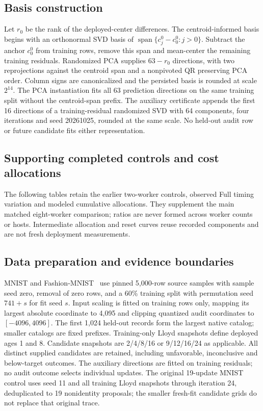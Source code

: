 \subsection{Basis construction}
Let $r_0$ be the rank of the deployed-center differences. The centroid-informed
basis begins with an orthonormal SVD basis of
$\operatorname{span}\{c^0_j-c^0_0:j>0\}$. Subtract the anchor $c^0_0$ from
training rows, remove this span and mean-center the remaining training
residuals. Randomized PCA supplies $63-r_0$ directions, with two
reprojections against the centroid span and a nonpivoted QR preserving PCA
order. Column signs are canonicalized and the persisted basis is rounded at
scale $2^{14}$. The PCA instantiation fits all 63 prediction directions on the
same training split without the centroid-span prefix. The auxiliary
certificate appends the first 16 directions of a training-residual randomized
SVD with 64 components, four iterations and seed 20261025, rounded at the same
scale. No held-out audit row or future candidate fits either representation.

\subsection{Supporting completed controls and cost allocations}
The following tables retain the earlier two-worker controls, observed Full
timing variation and modeled cumulative allocations. They supplement the
main matched eight-worker comparison; ratios are never formed across worker
counts or hosts. Intermediate allocation and reset curves reuse recorded
components and are not fresh deployment measurements.




\subsection{Data preparation and evidence boundaries}
MNIST and Fashion-MNIST~\cite{lecun1998,fashion2017} use pinned 5,000-row
source samples with sample seed zero, removal of zero rows, and a 60\%
training split with permutation seed $741+s$ for fit seed $s$. Input scaling
is fitted on training rows only, mapping its largest absolute coordinate to
4,095 and clipping quantized audit coordinates to $[-4096,4096]$.
The first 1,024 held-out records form the largest native catalog; smaller
catalogs are fixed prefixes. Training-only Lloyd snapshots define deployed
ages 1 and 8. Candidate snapshots are 2/4/8/16 or 9/12/16/24 as applicable.
All distinct supplied candidates are retained, including unfavorable,
inconclusive and below-target outcomes. The auxiliary directions are fitted
on training residuals; no audit outcome selects individual updates.
The original 19-update MNIST control uses seed 11 and all training Lloyd
snapshots through iteration 24, deduplicated to 19 nonidentity proposals;
the smaller fresh-fit candidate grids do not replace that original trace.

